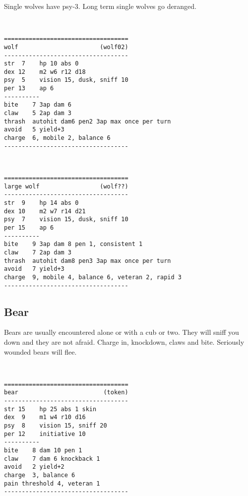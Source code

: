 Single wolves have psy-3. Long term single wolves go deranged.

\

\small \begin{verbatim}
===================================
wolf                       (wolf02)
-----------------------------------
str  7    hp 10 abs 0
dex 12    m2 w6 r12 d18
psy  5    vision 15, dusk, sniff 10
per 13    ap 6
----------
bite    7 3ap dam 6
claw    5 2ap dam 3
thrash  autohit dam6 pen2 3ap max once per turn
avoid   5 yield+3
charge  6, mobile 2, balance 6
-----------------------------------
\end{verbatim} \normalsize

\

\begin{samepage} \small \begin{verbatim}
===================================
large wolf                 (wolf??)
-----------------------------------
str  9    hp 14 abs 0
dex 10    m2 w7 r14 d21
psy  7    vision 15, dusk, sniff 10
per 15    ap 6
----------
bite    9 3ap dam 8 pen 1, consistent 1
claw    7 2ap dam 3
thrash  autohit dam8 pen3 3ap max once per turn
avoid   7 yield+3
charge  9, mobile 4, balance 6, veteran 2, rapid 3
-----------------------------------
\end{verbatim} \normalsize \end{samepage}



\begin{samepage}
\subsection*{Bear}
Bears are usually encountered alone or with a cub or two. They will sniff you down and they are not afraid. Charge in, knockdown, claws and bite. Seriously wounded bears will flee.

\

\small \begin{verbatim}
===================================
bear                        (token)
-----------------------------------
str 15    hp 25 abs 1 skin
dex  9    m1 w4 r10 d16
psy  8    vision 15, sniff 20
per 12    initiative 10
----------
bite    8 dam 10 pen 1
claw    7 dam 6 knockback 1
avoid   2 yield+2
charge  3, balance 6
pain threshold 4, veteran 1
-----------------------------------
\end{verbatim} \normalsize \end{samepage}

